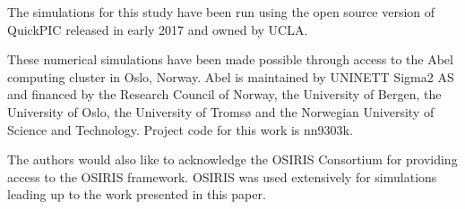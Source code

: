 \documentclass[aps,prstab,reprint,amsmath,amssymb,groupedaddress]{revtex4-1}
\begin{document}
The simulations for this study have been run using the open source version of QuickPIC released in early 2017 and owned
by UCLA.

These numerical simulations have been made possible through access to the Abel computing cluster in Oslo, Norway. Abel
is maintained by UNINETT Sigma2 AS and financed by the Research Council of Norway, the University of Bergen, the
University of Oslo, the University of Tromsø and the Norwegian University of Science and Technology. Project code for
this work is nn9303k.

The authors would also like to acknowledge the OSIRIS Consortium for providing access to the OSIRIS framework. OSIRIS
was used extensively for simulations leading up to the work presented in this paper.


\end{document}
